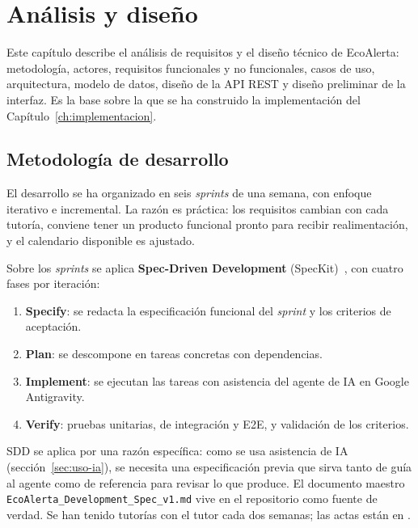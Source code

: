 \chapter{Análisis y diseño}
\label{ch:analisis-disenyo}

Este capítulo describe el análisis de requisitos y el diseño técnico de EcoAlerta: metodología, actores, requisitos funcionales y no funcionales, casos de uso, arquitectura, modelo de datos, diseño de la API REST y diseño preliminar de la interfaz. Es la base sobre la que se ha construido la implementación del Capítulo~\ref{ch:implementacion}.


\section{Metodología de desarrollo}
\label{sec:metodologia}

El desarrollo se ha organizado en seis \textit{sprints} de una semana, con enfoque iterativo e incremental. La razón es práctica: los requisitos cambian con cada tutoría, conviene tener un producto funcional pronto para recibir realimentación, y el calendario disponible es ajustado.

Sobre los \textit{sprints} se aplica \textbf{Spec-Driven Development} (SpecKit)~\parencite{speckit}, con cuatro fases por iteración:

\begin{enumerate}
  \item \textbf{Specify}: se redacta la especificación funcional del \textit{sprint} y los criterios de aceptación.
  \item \textbf{Plan}: se descompone en tareas concretas con dependencias.
  \item \textbf{Implement}: se ejecutan las tareas con asistencia del agente de IA en Google Antigravity.
  \item \textbf{Verify}: pruebas unitarias, de integración y E2E, y validación de los criterios.
\end{enumerate}

SDD se aplica por una razón específica: como se usa asistencia de IA (sección~\ref{sec:uso-ia}), se necesita una especificación previa que sirva tanto de guía al agente como de referencia para revisar lo que produce. El documento maestro \texttt{EcoAlerta\_Development\_Spec\_v1.md} vive en el repositorio como fuente de verdad. Se han tenido tutorías con el tutor cada dos semanas; las actas están en .


